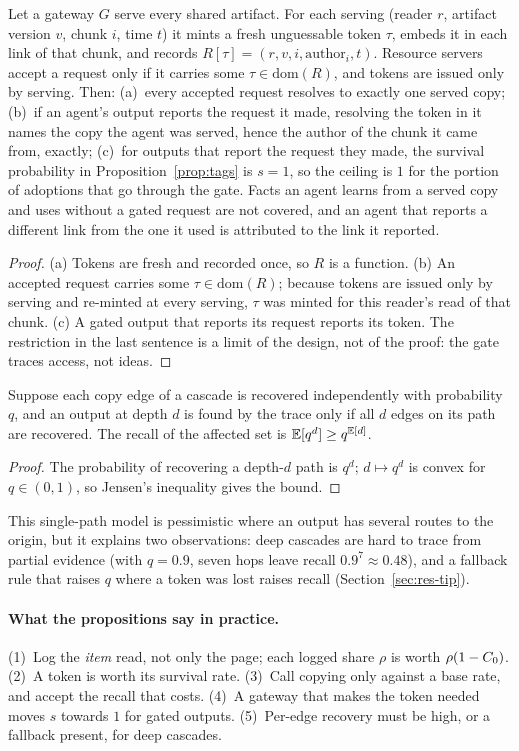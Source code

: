 \begin{proposition}\label{prop:gate}
Let a gateway $G$ serve every shared artifact. For each serving (reader $r$, artifact version $v$, chunk $i$, time $t$) it mints a fresh unguessable token $\tau$, embeds it in each link of that chunk, and records $R[\tau]=(r,v,i,\mathrm{author}_i,t)$. Resource servers accept a request only if it carries some $\tau\in\mathrm{dom}(R)$, and tokens are issued only by serving. Then: (a)~every accepted request resolves to exactly one served copy; (b)~if an agent's output reports the request it made, resolving the token in it names the copy the agent was served, hence the author of the chunk it came from, exactly; (c)~for outputs that report the request they made, the survival probability in Proposition~\ref{prop:tags} is $s=1$, so the ceiling is $1$ for the portion of adoptions that go through the gate. Facts an agent learns from a served copy and uses without a gated request are not covered, and an agent that reports a different link from the one it used is attributed to the link it reported.
\end{proposition}
\begin{proof}
(a) Tokens are fresh and recorded once, so $R$ is a function. (b) An accepted request carries some $\tau\in\mathrm{dom}(R)$; because tokens are issued only by serving and re-minted at every serving, $\tau$ was minted for this reader's read of that chunk. (c) A gated output that reports its request reports its token. The restriction in the last sentence is a limit of the design, not of the proof: the gate traces access, not ideas.
\end{proof}

\begin{proposition}[Depth]\label{prop:depth}
Suppose each copy edge of a cascade is recovered independently with probability $q$, and an output at depth $d$ is found by the trace only if all $d$ edges on its path are recovered. The recall of the affected set is $\mathbb{E}[q^{d}]\ge q^{\mathbb{E}[d]}$.
\end{proposition}
\begin{proof}
The probability of recovering a depth-$d$ path is $q^d$; $d\mapsto q^d$ is convex for $q\in(0,1)$, so Jensen's inequality gives the bound.
\end{proof}
This single-path model is pessimistic where an output has several routes to the origin, but it explains two observations: deep cascades are hard to trace from partial evidence (\eg with $q=0.9$, seven hops leave recall $0.9^7\approx0.48$), and a fallback rule that raises $q$ where a token was lost raises recall (Section~\ref{sec:res-tip}).

\paragraph{What the propositions say in practice.}
(1)~Log the \emph{item} read, not only the page; each logged share $\rho$ is worth $\rho(1-C_0)$. (2)~A token is worth its survival rate. (3)~Call copying only against a base rate, and accept the recall that costs. (4)~A gateway that makes the token needed moves $s$ towards $1$ for gated outputs. (5)~Per-edge recovery must be high, or a fallback present, for deep cascades.
